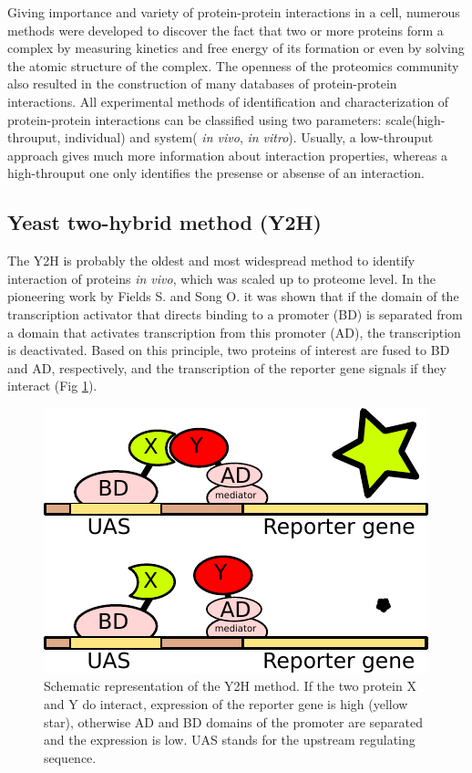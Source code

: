 Giving importance and variety of protein-protein interactions in a cell, numerous methods were developed to discover the fact that 
two or more proteins form a complex by measuring kinetics and free energy of its formation or even by solving the atomic structure of the complex.
The openness of the proteomics community also resulted in the construction of many databases of protein-protein interactions. All experimental methods of 
identification and characterization of protein-protein interactions
can be classified using two parameters: scale(high-throuput, individual) and system( \emph{in vivo}, \emph{in vitro}). Usually, a low-throuput approach
gives much more information about interaction properties, whereas a high-throuput one only identifies the presense or absense of an interaction.

\subsection{Yeast two-hybrid method (Y2H)}
The Y2H is probably the oldest and most widespread method to identify interaction of proteins \emph{in vivo}, which was scaled up to proteome level.
In the pioneering work by Fields S. and Song  O. \cite{fields1989novel} it was shown that if the domain of the transcription activator that directs 
binding to a promoter (BD) is separated from a domain that activates transcription from this promoter (AD), the transcription is deactivated.
Based on this principle, two proteins of interest are fused to BD and AD, respectively, and the transcription of the reporter gene signals if they interact (Fig \ref{Fig:Y2H}).

\begin{figure}[H]
    \begin{centering}
      \includegraphics[width=0.5\linewidth]{Intro/Fig/Y2H.pdf}  
      \caption[Y2H explanation]{Schematic representation of the Y2H method. If the two protein X and Y do interact, expression of the reporter gene is high (yellow star), otherwise
      AD and BD domains of the promoter are separated and the expression is low. UAS stands for the upstream regulating sequence.}
      \label{Fig:Y2H}
    \end{centering}
\end{figure}

